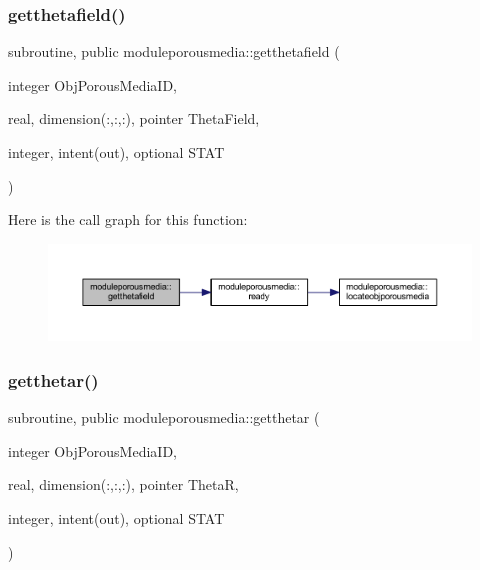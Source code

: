 \subsubsection{\texorpdfstring{getthetafield()}{getthetafield()}}
{\footnotesize\ttfamily subroutine, public moduleporousmedia\+::getthetafield (\begin{DoxyParamCaption}\item[{integer}]{Obj\+Porous\+Media\+ID,  }\item[{real, dimension(\+:,\+:,\+:), pointer}]{Theta\+Field,  }\item[{integer, intent(out), optional}]{S\+T\+AT }\end{DoxyParamCaption})}

Here is the call graph for this function\+:\nopagebreak
\begin{figure}[H]
\begin{center}
\leavevmode
\includegraphics[width=350pt]{namespacemoduleporousmedia_a4733e16297b69cfac43e1f2f0cd30381_cgraph}
\end{center}
\end{figure}
\mbox{\label{namespacemoduleporousmedia_a40c5d4f62420edfa4bfd5f6ec20d6eda}} 
\subsubsection{\texorpdfstring{getthetar()}{getthetar()}}
{\footnotesize\ttfamily subroutine, public moduleporousmedia\+::getthetar (\begin{DoxyParamCaption}\item[{integer}]{Obj\+Porous\+Media\+ID,  }\item[{real, dimension(\+:,\+:,\+:), pointer}]{ThetaR,  }\item[{integer, intent(out), optional}]{S\+T\+AT }\end{DoxyParamCaption})}

